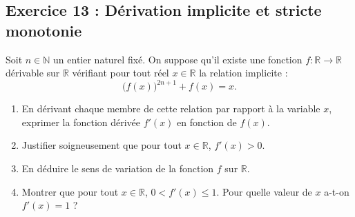 \documentclass[11pt,a4paper]{article}
\newcommand{\N}{\mathbb{N}}
\newcommand{\R}{\mathbb{R}}
\begin{document}
\subsection*{Exercice 13 : Dérivation implicite et stricte monotonie}

Soit $n \in \N$ un entier naturel fixé. On suppose qu'il existe une fonction $f : \R \to \R$ dérivable sur $\R$ vérifiant pour tout réel $x \in \R$ la relation implicite :
\[
\big(f(x)\big)^{2n+1} + f(x) = x.
\]
\begin{enumerate}[label=\textbf{\arabic*.}]
    \item En dérivant chaque membre de cette relation par rapport à la variable $x$, exprimer la fonction dérivée $f'(x)$ en fonction de $f(x)$.
    \item Justifier soigneusement que pour tout $x \in \R$, $f'(x) > 0$.
    \item En déduire le sens de variation de la fonction $f$ sur $\R$.
    \item Montrer que pour tout $x \in \R$, $0 < f'(x) \le 1$. Pour quelle valeur de $x$ a-t-on $f'(x) = 1$ ?
\end{enumerate}
\end{document}
